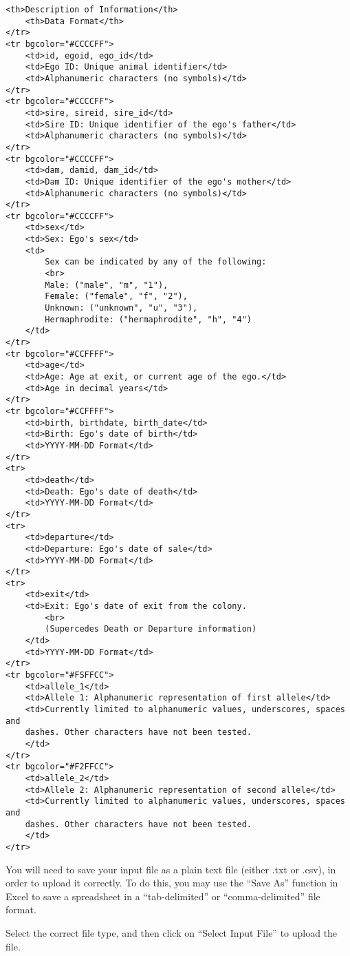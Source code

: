 \documentclass[]{article}
\begin{document}
\begin{verbatim}
<th>Description of Information</th>
    <th>Data Format</th>
</tr>
<tr bgcolor="#CCCCFF">
    <td>id, egoid, ego_id</td>
    <td>Ego ID: Unique animal identifier</td>
    <td>Alphanumeric characters (no symbols)</td>
</tr>
<tr bgcolor="#CCCCFF">
    <td>sire, sireid, sire_id</td>
    <td>Sire ID: Unique identifier of the ego's father</td>
    <td>Alphanumeric characters (no symbols)</td>
</tr>
<tr bgcolor="#CCCCFF">
    <td>dam, damid, dam_id</td>
    <td>Dam ID: Unique identifier of the ego's mother</td>
    <td>Alphanumeric characters (no symbols)</td>
</tr>
<tr bgcolor="#CCCCFF">
    <td>sex</td>
    <td>Sex: Ego's sex</td>
    <td>
        Sex can be indicated by any of the following:
        <br>
        Male: ("male", "m", "1"),
        Female: ("female", "f", "2"),
        Unknown: ("unknown", "u", "3"),
        Hermaphrodite: ("hermaphrodite", "h", "4")
    </td>
</tr>
<tr bgcolor="#CCFFFF">
    <td>age</td>
    <td>Age: Age at exit, or current age of the ego.</td>
    <td>Age in decimal years</td>
</tr>
<tr bgcolor="#CCFFFF">
    <td>birth, birthdate, birth_date</td>
    <td>Birth: Ego's date of birth</td>
    <td>YYYY-MM-DD Format</td>
</tr>
<tr>
    <td>death</td>
    <td>Death: Ego's date of death</td>
    <td>YYYY-MM-DD Format</td>
</tr>
<tr>
    <td>departure</td>
    <td>Departure: Ego's date of sale</td>
    <td>YYYY-MM-DD Format</td>
</tr>
<tr>
    <td>exit</td>
    <td>Exit: Ego's date of exit from the colony.
        <br>
        (Supercedes Death or Departure information)
    </td>
    <td>YYYY-MM-DD Format</td>
</tr>
<tr bgcolor="#FSFFCC">
    <td>allele_1</td>
    <td>Allele 1: Alphanumeric representation of first allele</td>
    <td>Currently limited to alphanumeric values, underscores, spaces and
    dashes. Other characters have not been tested.
    </td>
</tr>
<tr bgcolor="#F2FFCC">
    <td>allele_2</td>
    <td>Allele 2: Alphanumeric representation of second allele</td>
    <td>Currently limited to alphanumeric values, underscores, spaces and
    dashes. Other characters have not been tested.
    </td>
</tr>
\end{verbatim}

You will need to save your input file as a plain text file (either .txt
or .csv), in order to upload it correctly. To do this, you may use the
``Save As'' function in Excel to save a spreadsheet in a
``tab-delimited'' or ``comma-delimited'' file format.

Select the correct file type, and then click on ``Select Input File'' to
upload the file.
\end{document}
